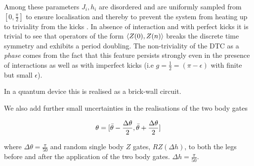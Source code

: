 Among these parameters $J_i, h_i$ are disordered and are uniformly sampled from $[0,\frac{\pi}{2}]$ to ensure localisation and thereby to prevent the system from heating up to triviality from the kicks \cite{Khemani2015phasestructre}. In absence of interaction and with perfect kicks it is trivial to see that operators of the form $\braket{Z(0),Z(n)}$ breaks the discrete time symmetry and exhibits a period doubling. The non-triviality of the DTC as a \textit{phase} comes from the fact that this feature persists strongly even in the presence of interactions as well as with imperfect kicks (i.e $g=\frac{1}{2}=(\pi-\epsilon)$ with finite but small $\epsilon$). 

In a quantum device this is realised as a brick-wall circuit. 


We also add further small uncertainties in the realisations of the two body gates 

\begin{equation}
    \theta=[\Bar{\theta}-\frac{\Delta\theta}{2},\Bar{\theta}+\frac{\Delta\theta}{2}]
\end{equation}

where $\Delta\theta=\frac{\pi}{50}$ and random single body $Z$ gates, $RZ(\Delta h)$, to both the legs before and after the application of the two body gates. $\Delta h=\frac{\pi}{50}$.
